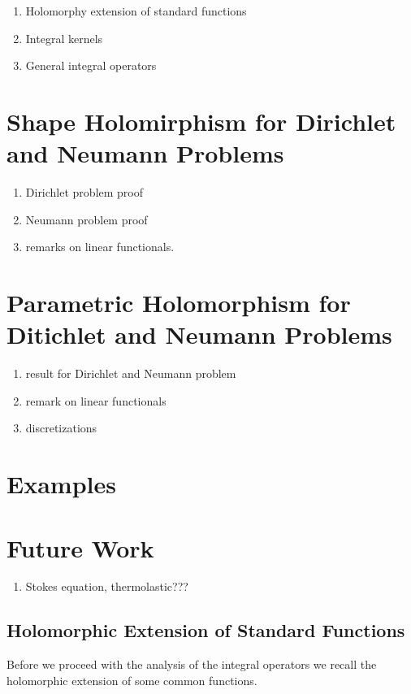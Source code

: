 \documentclass{article}
\begin{document}
\begin{enumerate}
\item 
Holomorphy extension of standard functions 
\item 
Integral kernels 
\item 
General integral operators
\end{enumerate}

\section{Shape Holomirphism for Dirichlet and Neumann Problems}
\begin{enumerate}
\item 
Dirichlet problem proof
\item 
Neumann problem proof 
\item 
remarks on linear functionals.
\end{enumerate}

\section{Parametric Holomorphism for Ditichlet and Neumann Problems}
\begin{enumerate}
\item 
result for Dirichlet and Neumann problem 
\item 
remark on linear functionals
\item 
discretizations
\end{enumerate}

\section{Examples}

\section{Future Work}
\begin{enumerate}
\item 
Stokes equation, thermolastic???
\end{enumerate}




\subsection{Holomorphic Extension of Standard Functions}
Before we proceed with the analysis of the integral operators we recall the holomorphic extension of some common functions.
\end{document}
